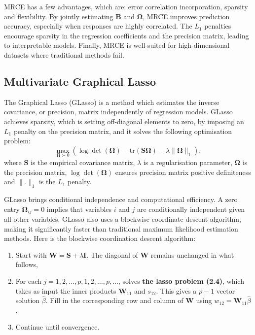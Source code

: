 \noindent MRCE has a few advantages, which are: error correlation incorporation, sparsity and flexibility. By jointly estimating \( \mathbf{B} \) and \( \boldsymbol{\Omega} \), MRCE improves prediction accuracy, especially when responses are highly correlated.
 The $L_1$ penalties encourage sparsity in the regression coefficients and the precision matrix, leading to interpretable models. Finally, MRCE is well-suited for high-dimensional datasets where traditional methods fail.


\subsection{Multivariate Graphical Lasso}
The Graphical Lasso (GLasso) is a method which estimates the inverse covariance, or precision, matrix independently of regression models. GLasso achieves sparsity, which is setting off-diagonal elements to zero, by imposing an $L_1$ penalty on the precision matrix, and it solves the following optimisation problem:
\begin{equation}
    \max_{\boldsymbol{\Omega} \succ 0} \left( \log \det (\boldsymbol{\Omega}) - \text{tr}(\mathbf{S}  \boldsymbol{\Omega}) - \lambda \|\boldsymbol{\Omega}\|_1 \right),
\label{GL}
\end{equation}
where \( \mathbf{S}  \) is the empirical covariance matrix, \( \lambda \) is a regularisation parameter, \( \boldsymbol{\Omega}\) is the precision matrix, \( \log \det (\boldsymbol{\Omega}) \) ensures precision matrix positive definiteness and \( \|.\|_1 \) is the $L_1$ penalty.\citep{friedman2008sparse}

GLasso brings conditional independence and computational efficiency. A zero entry \( \boldsymbol{\Omega}_{ij} = 0 \) implies that variables \( i \) and \( j \) are conditionally independent given all other variables. GLasso also uses a blockwise coordinate descent algorithm, making it significantly faster than traditional maximum likelihood estimation methods. Here is the blockwise coordination descent algorithm:

\begin{enumerate}
    \item Start with \( \mathbf{W} = \mathbf{S} + \lambda \mathbf{I} \). The diagonal of \( \mathbf{W} \) remains unchanged in what follows, 
    \item For each \( j = 1,2,\dots, p, 1,2,\dots, p, \dots \), solves \textbf{the lasso problem (2.4)}, which takes as input the inner products \( \mathbf{W}_{11} \) and \( s_{12} \). This gives a \( p - 1 \) vector solution \( \hat{\beta} \). Fill in the corresponding row and column of \( \mathbf{W} \) using \( w_{12} = \mathbf{W}_{11} \hat{\beta} \),
    \item Continue until convergence.\cite{friedman2008sparse}
\end{enumerate}

